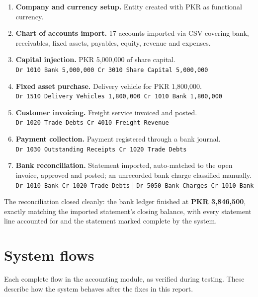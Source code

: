 \documentclass[11pt,a4paper]{article}
\newcommand{\acct}[1]{\texttt{\small #1}}
\begin{document}
\begin{enumerate}[leftmargin=*]
  \item \textbf{Company and currency setup.} Entity created with PKR as functional currency.
  \item \textbf{Chart of accounts import.} 17 accounts imported via CSV covering bank, receivables,
        fixed assets, payables, equity, revenue and expenses.
  \item \textbf{Capital injection.} PKR 5,000,000 of share capital.\\
        \acct{Dr 1010 Bank 5,000,000 \quad Cr 3010 Share Capital 5,000,000}
  \item \textbf{Fixed asset purchase.} Delivery vehicle for PKR 1,800,000.\\
        \acct{Dr 1510 Delivery Vehicles 1,800,000 \quad Cr 1010 Bank 1,800,000}
  \item \textbf{Customer invoicing.} Freight service invoiced and posted.\\
        \acct{Dr 1020 Trade Debts \quad Cr 4010 Freight Revenue}
  \item \textbf{Payment collection.} Payment registered through a bank journal.\\
        \acct{Dr 1030 Outstanding Receipts \quad Cr 1020 Trade Debts}
  \item \textbf{Bank reconciliation.} Statement imported, auto-matched to the open invoice,
        approved and posted; an unrecorded bank charge classified manually.\\
        \acct{Dr 1010 Bank \quad Cr 1020 Trade Debts} \quad$|$\quad
        \acct{Dr 5050 Bank Charges \quad Cr 1010 Bank}
\end{enumerate}

The reconciliation closed cleanly: the bank ledger finished at \textbf{PKR 3,846,500}, exactly
matching the imported statement's closing balance, with every statement line accounted for and the
statement marked complete by the system.

\newpage
\section{System flows}

Each complete flow in the accounting module, as verified during testing. These describe how the
system behaves after the fixes in this report.

\end{document}
